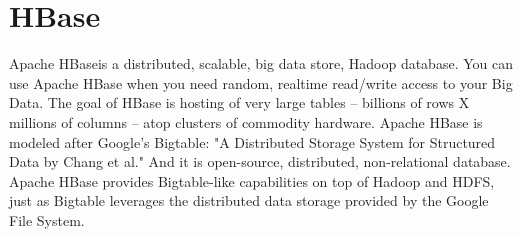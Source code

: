 \section{HBase}

Apache HBase\cite{hid-sp18-515-www-hbase}is a distributed, scalable, 
big data store, Hadoop database. 
You can use Apache HBase when you need random, realtime read/write 
access to your Big Data.
The goal of HBase is hosting of very large tables -- billions of rows 
X millions of columns -- atop clusters of commodity hardware.
Apache HBase is modeled after Google's Bigtable: "A Distributed Storage 
System for Structured Data by Chang et al."
And it is open-source, distributed, non-relational database.
Apache HBase provides Bigtable-like capabilities on top of Hadoop and HDFS, 
just as Bigtable leverages the distributed data storage provided by 
the Google File System. 
